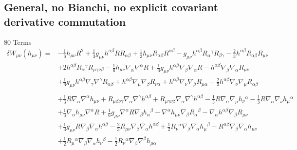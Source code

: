 \documentclass[10pt,letterpaper]{article}
\begin{document}
\subsection*{General, no Bianchi, no explicit covariant derivative commutation}
80 Terms
 \begin{align}
\delta W_{\mu\nu}(h_{\mu\nu})={}&- \tfrac{1}{6} h_{\mu \nu} R^2
 + \tfrac{1}{3} g_{\mu \nu} h^{\alpha \beta} R R_{\alpha \beta}
 + \tfrac{1}{2} h_{\mu \nu} R_{\alpha \beta} R^{\alpha \beta}
 -  g_{\mu \nu} h^{\alpha \beta} R_{\alpha}{}^{\gamma} R_{\beta \gamma}
 -  \tfrac{2}{3} h^{\alpha \beta} R_{\alpha \beta} R_{\mu \nu}\nonumber\\
& + 2 h^{\alpha \beta} R_{\alpha}{}^{\gamma} R_{\mu \gamma \nu \beta}
 -  \tfrac{1}{6} h_{\mu \nu} \nabla_{\alpha}\nabla^{\alpha}R
 + \tfrac{1}{6} g_{\mu \nu} h^{\alpha \beta} \nabla_{\beta}\nabla_{\alpha}R
 -  h^{\alpha \beta} \nabla_{\beta}\nabla_{\alpha}R_{\mu \nu}\nonumber\\
& + \tfrac{1}{6} g_{\mu \nu} h^{\alpha \beta} \nabla_{\gamma}\nabla^{\gamma}R_{\alpha \beta}
 + h^{\alpha \beta} \nabla_{\mu}\nabla_{\beta}R_{\nu \alpha}
 + h^{\alpha \beta} \nabla_{\nu}\nabla_{\beta}R_{\mu \alpha}
 -  \tfrac{2}{3} h^{\alpha \beta} \nabla_{\nu}\nabla_{\mu}R_{\alpha \beta}\nonumber \\ \nonumber
\\
&+\tfrac{1}{3} R \nabla_{\alpha}\nabla^{\alpha}h_{\mu \nu}
 + R_{\mu \beta \nu \gamma} \nabla_{\alpha}\nabla^{\gamma}h^{\alpha \beta}
 + R_{\mu \gamma \nu \beta} \nabla_{\alpha}\nabla^{\gamma}h^{\alpha \beta}
 -  \tfrac{1}{3} R \nabla_{\alpha}\nabla_{\mu}h_{\nu}{}^{\alpha}
 -  \tfrac{1}{3} R \nabla_{\alpha}\nabla_{\nu}h_{\mu}{}^{\alpha}\nonumber\\
& + \tfrac{1}{3} \nabla_{\alpha}h_{\mu \nu} \nabla^{\alpha}R
 + \tfrac{1}{6} g_{\mu \nu} \nabla^{\alpha}R \nabla_{\beta}h_{\alpha}{}^{\beta}
 -  \nabla^{\alpha}h_{\mu \nu} \nabla_{\beta}R_{\alpha}{}^{\beta}
 -  \nabla_{\alpha}h^{\alpha \beta} \nabla_{\beta}R_{\mu \nu}\nonumber\\
& + \tfrac{1}{3} g_{\mu \nu} R \nabla_{\beta}\nabla_{\alpha}h^{\alpha \beta}
 -  \tfrac{2}{3} R_{\mu \nu} \nabla_{\beta}\nabla_{\alpha}h^{\alpha \beta}
 + \tfrac{1}{2} R_{\nu}{}^{\alpha} \nabla_{\beta}\nabla_{\alpha}h_{\mu}{}^{\beta}
 -  R^{\alpha \beta} \nabla_{\beta}\nabla_{\alpha}h_{\mu \nu}\nonumber\\
& + \tfrac{1}{2} R_{\mu}{}^{\alpha} \nabla_{\beta}\nabla_{\alpha}h_{\nu}{}^{\beta}
 -  \tfrac{1}{2} R_{\nu}{}^{\alpha} \nabla_{\beta}\nabla^{\beta}h_{\mu \alpha}

\end{align}
\end{document}

